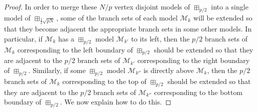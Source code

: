 \documentclass[kpfonts,lotsofwhite]{patmorin}
\newcommand{\boxprod}{\mathbin{\Box}}
\DeclarePairedDelimiter{\ceil}{\lceil}{\rceil}
\renewcommand{\emptyset}{\varnothing}
\renewcommand{\le}{\leqslant}
\theoremstyle{plain}
\theoremstyle{definition}
\begin{document}
\begin{proof}

  In order to merge these $N/p$ vertex disjoint models of $\boxplus_{p/2}$ into a single model of $\boxplus_{\tfrac 12\sqrt{pN}}$, some of the branch sets of each model $\mathcal{M}_k$ will be extended so that they become adjacent the appropriate branch sets in some other models.  In particular, if $\mathcal{M}_k$ has a $\boxplus_{p/2}$ model $\mathcal{M}_{k'}$ to its left, then the $p/2$ branch sets of $\mathcal{M}_k$ corresponding to the left boundary of $\boxplus_{p/2}$ should be extended so that they are adjacent to the $p/2$ branch sets of $\mathcal{M}_{k'}$ corresponding to the right boundary of $\boxplus_{p/2}$.  Similarly, if some $\boxplus_{p/2}$ model $\mathcal{M}_{k''}$ is directly above $\mathcal{M}_k$, then the $p/2$ branch sets of $\mathcal{M}_k$ corresponding to the top of $\boxplus_{p/2}$ should be extended so that they are adjacent to the $p/2$ branch sets of $\mathcal{M}_{k''}$ corresponding to the bottom boundary of $\boxplus_{p/2}$.  We now explain how to do this.


\end{proof}
\end{document}
